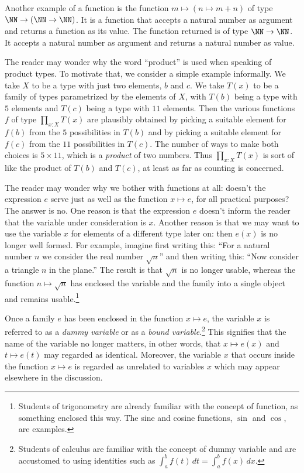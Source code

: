 Another example of a function is the function $m \mapsto (n \mapsto m+n)$ of type $\NN \to (\NN \to \NN)$.  It is a function that accepts a
natural number as argument and returns a function as its value.  The function returned is of type $\NN \to \NN$.  It accepts a natural number
as argument and returns a natural number as value.

The reader may wonder why the word ``product'' is used when speaking of product types.  To motivate that, we consider a simple example
informally.  We take $X$ to be a type with just two elements, $b$ and $c$.  We take $T(x)$ to be a family of types parametrized by the elements
of $X$, with $T(b)$ being a type with $5$ elements and $T(c)$ being a type with $11$ elements.  Then the various functions $f$ of type
$\prod_{x:X} T(x)$ are plausibly obtained by picking a suitable element for $f(b)$ from the $5$ possibilities in $T(b)$ and by picking a
suitable element for $f(c)$ from the $11$ possibilities in $T(c)$.  The number of ways to make both choices is $5 \times 11$, which is a
\emph{product} of two numbers.  Thus $\prod_{x:X} T(x)$ is sort of like the product of $T(b)$ and $T(c)$, at least as far as counting is
concerned.

The reader may wonder why we bother with functions at all: doesn't the expression $e$ serve just as well as the function $x \mapsto e$, for all
practical purposes?  The answer is no.  One reason is that the expression $e$ doesn't inform the reader that the variable under consideration is
$x$.  Another reason is that we may want to use the variable $x$ for elements of a different type later on: then $e(x)$ is no longer well
formed.  For example, imagine first writing this: ``For a natural number $n$ we consider the real number $\sqrt n$'' and then writing this:
``Now consider a triangle $n$ in the plane.''  The result is that $\sqrt n$ is no longer usable, whereas the function $n \mapsto \sqrt n$ has
enclosed the variable and the family into a single object and remains usable.\footnote{Students of trigonometry are already familiar with the
concept of function, as something enclosed this way.  The sine and cosine functions, $\sin$ and $\cos$, are examples.}

Once a family $e$ has been enclosed in the function $x \mapsto e$, the variable $x$ is referred to as a \emph{dummy variable} or as a \emph{bound variable}.\footnote{Students of calculus are familiar with the concept of dummy variable
and are accustomed to using identities such as $\int_a^b f(t)\,dt = \int_a^b f(x)\,dx$.} This signifies that the name of the variable no longer
matters, in other words, that $x \mapsto e(x)$ and $t \mapsto e(t)$ may regarded as identical.  Moreover, the variable $x$ that occurs inside
the function $x \mapsto e$ is regarded as unrelated to variables $x$ which may appear elsewhere in the discussion.

